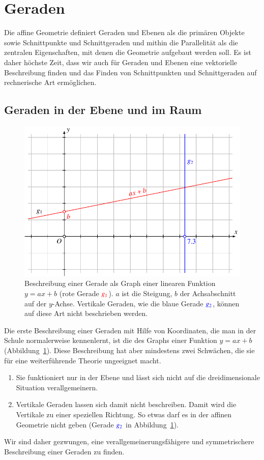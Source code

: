 %
%
%
\section{Geraden%
\label{section:geraden}}
Die affine Geometrie definiert Geraden und Ebenen als die primären Objekte
sowie Schnittpunkte und Schnittgeraden und mithin die Parallelität als die
zentralen Eigenschaften, mit denen die Geometrie aufgebaut werden soll.
Es ist daher höchste Zeit, dass wir auch für Geraden und Ebenen eine
vektorielle Beschreibung finden und das Finden von Schnittpunkten
und Schnittgeraden auf rechnerische Art ermöglichen.

%
%
\subsection{Geraden in der Ebene und im Raum}
\begin{figure}
\centering
\includegraphics{3/images/geradeaxb.pdf}
\caption{Beschreibung einer Gerade als Graph einer linearen Funktion
$y=ax+b$ (rote Gerade $\color{red}g_1$).
$a$ ist die Steigung, $b$ der Achsabschnitt auf der $y$-Achse.
Vertikale Geraden, wie die blaue Gerade $\color{blue}g_2$, können auf diese
Art nicht beschrieben werden.
\label{skript:affin:geradeaxb}}
\end{figure}
Die erste Beschreibung einer Geraden mit Hilfe von Koordinaten, die man in
der Schule normalerweise kennenlernt, ist die des Graphs einer Funktion
$y=ax+b$ (Abbildung~\ref{skript:affin:geradeaxb}).
Diese Beschreibung hat aber mindestens zwei Schwächen, die sie für eine
weiterführende Theorie ungeeignet macht.
\begin{enumerate}
\item Sie funktioniert nur in der Ebene und lässt sich nicht auf die
dreidimensionale Situation verallgemeinern.
\item Vertikale Geraden lassen sich damit nicht beschreiben.
Damit wird die Vertikale zu einer speziellen Richtung.
So etwas darf
es in der affinen Geometrie nicht geben (Gerade $\color{blue}g_2$ in
Abbildung~\ref{skript:affin:geradeaxb}).
\end{enumerate}
Wir sind daher gezwungen, eine verallgemeinerungsfähigere und symmetrischere
Beschreibung einer Geraden zu finden.

